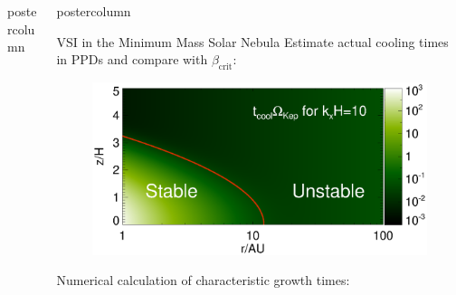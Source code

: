 \documentclass[final,hyperref={pdfpagelabels=false}]{beamer}
\newlength{\columnheight}
\begin{document}
\begin{frame}
\begin{columns}
\begin{column}{.49\textwidth}
\begin{beamercolorbox}[center,wd=\textwidth]{postercolumn}
\begin{minipage}[T]{.95\textwidth}
{             
             
          }
        \end{minipage}
      \end{beamercolorbox}
    \end{column}
    
    \begin{column}{.49\textwidth}
      \begin{beamercolorbox}[center,wd=\textwidth]{postercolumn}
        \begin{minipage}[T]{.95\textwidth} %
          \parbox[t][\columnheight]{\textwidth}{   
              \begin{block}{{\Large VSI in the Minimum Mass Solar Nebula}}
                \justifying
                Estimate actual cooling times in PPDs and compare with
                $\beta_\mathrm{crit}$:\\
                \vspace{-1.5cm}
                \begin{figure}
                  \includegraphics[width=\linewidth]{figures/bcrit_mmsn2d.ps}
                \end{figure}
                \vspace{-1.5cm}
                Numerical calculation of characteristic growth
                times:\\
                \vspace{-1.5cm}
                \begin{figure}

\end{figure}
\end{block}}
\end{minipage}
\end{beamercolorbox}
\end{column}
\end{columns}
\end{frame}
\end{document}
